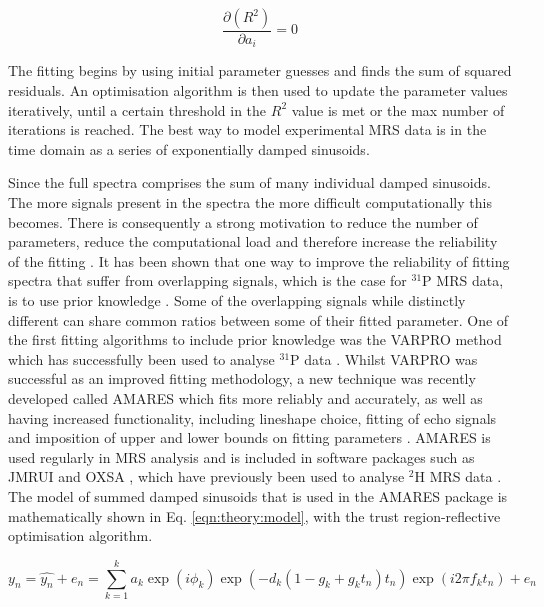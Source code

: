 \begin{equation}
    \frac{\partial (R^2)}{\partial a_i} = 0
    \label{eqn:theory:Diff}
\end{equation}

\noindent The fitting begins by using initial parameter guesses and finds the sum of squared residuals. An optimisation algorithm is then used to update the parameter values iteratively, until a certain threshold in the $R^2$ value is met or the max number of iterations is reached. The best way to model experimental \ac{MRS} data is in the time domain as a series of exponentially damped sinusoids. 

Since the full spectra comprises the sum of many individual damped sinusoids. The more signals present in the spectra the more difficult computationally this becomes. There is consequently a strong motivation to reduce the number of parameters, reduce the computational load and therefore increase the reliability of the fitting \cite{Near2021PreprocessingRecommendations}. It has been shown that one way to improve the reliability of fitting spectra that suffer from overlapping signals, which is the case for $^{31}$P \ac{MRS} data, is to use prior knowledge \cite{Hamilton2003PriorSpectra}. Some of the overlapping signals while distinctly different can share common ratios between some of their fitted parameter. One of the first fitting algorithms to include prior knowledge was the \ac{VARPRO} method \cite{Golub1973TheSeparate} which has successfully been used to analyse $^{31}$P data \cite{vanderVeen1988AccurateKnowledge,Stubbs199631P-MagneticADP}. Whilst \ac{VARPRO} was successful as an improved fitting methodology, a new technique was recently developed called \ac{AMARES} which fits more reliably and accurately, as well as having increased functionality, including lineshape choice, fitting of echo signals and imposition of upper and lower bounds on fitting parameters \cite{Vanhamme1997ImprovedKnowledge}. \ac{AMARES} is used regularly in \ac{MRS} analysis and is included in software packages such as JMRUI \cite{Stefan2009QuantitationPackage} and OXSA \cite{Purvis2017OXSA:MATLAB}, which have previously been used to analyse $^2$H \ac{MRS} data \cite{Simoes2022GlucoseGlioblastoma,Kreis2020MeasuringMRI,Kaggie2022DeuteriumMetabolism}. The model of summed damped sinusoids that is used in the \ac{AMARES} package is mathematically shown in Eq. \ref{eqn:theory:model}, with the trust region-reflective optimisation algorithm.

\begin{equation}
    y_n = \hat{y_n} + e_n = \sum_{k=1}^{k}a_k\exp(i\phi_k)\exp(-d_k(1-g_k+g_kt_n)t_n)\exp(i2\pi f_kt_n) + e_n
    \label{eqn:theory:model}
\end{equation}

